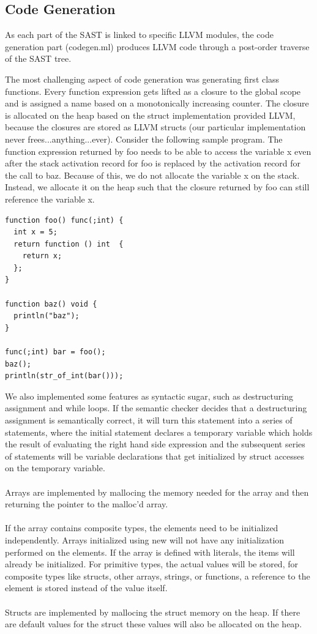 \documentclass[12pt]{article}
\begin{document}
\subsection{Code Generation}
As each part of the SAST is linked to specific LLVM modules, the code generation part (codegen.ml) produces LLVM code through a post-order traverse of the SAST tree.

The most challenging aspect of code generation was generating first class functions. Every function expression gets lifted as a closure to the global scope and is assigned a name based on a monotonically increasing counter.  The closure is allocated on the heap based on the struct implementation provided LLVM, because the closures are stored as LLVM structs (our particular implementation never frees...anything...ever). Consider the following sample program. The function expression returned by foo needs to be able to access the variable x even after the stack activation record for foo is replaced by the activation record for the call to baz. Because of this, we do not allocate the variable x on the stack. Instead, we allocate it on the heap such that the closure returned by foo can still reference the variable x. 

\begin{lstlisting}
function foo() func(;int) {
  int x = 5;
  return function () int  {
    return x;
  };
}

function baz() void {
  println("baz");
}

func(;int) bar = foo();
baz();
println(str_of_int(bar()));
\end{lstlisting}

We also implemented some features as syntactic sugar, such as destructuring assignment and while loops. If the semantic checker decides that a destructuring assignment is semantically correct, it will turn this statement into a series of statements, where the initial statement declares a temporary variable which holds the result of evaluating the right hand side expression and the subsequent series of statements will be variable declarations that get initialized by struct accesses on the temporary variable.
\\ \\
Arrays are implemented by mallocing the memory needed for the array and then returning the pointer to the malloc'd array. 
\\ \\
If the array contains composite types, the elements need to be initialized independently. Arrays initialized using new will not have any initialization performed on the elements. If the array is defined with literals, the items will already be initialized. For primitive types, the actual values will be stored, for composite types like structs, other arrays, strings, or functions, a reference to the element is stored instead of the value itself. 
\\ \\
Structs are implemented by mallocing the struct memory on the heap. If there are default values for the struct these values will also be allocated on the heap.
\end{document}
